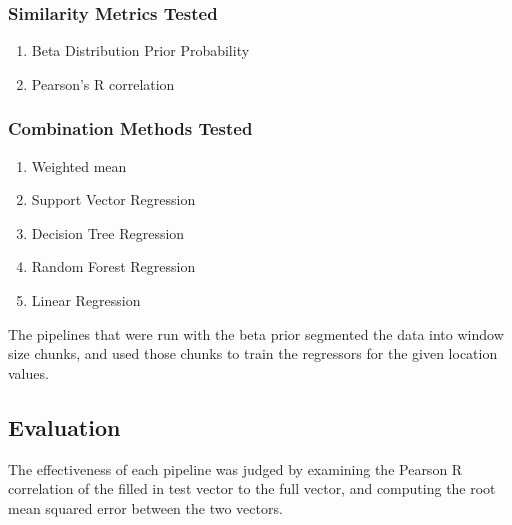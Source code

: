 \documentclass{article} %
\begin{document}
\subsubsection{Similarity Metrics Tested}
\begin{enumerate}
	\item Beta Distribution Prior Probability
	\item Pearson's R correlation
\end{enumerate}

\subsubsection{Combination Methods Tested}
\begin{enumerate}
	\item Weighted mean
	\item Support Vector Regression
	\item Decision Tree Regression
	\item Random Forest Regression
	\item Linear Regression
\end{enumerate}

The pipelines that were run with the beta prior segmented the data into window size chunks, and used those chunks to train the regressors for the given location values.

\subsection{Evaluation}
The effectiveness of each pipeline was judged by examining the Pearson R correlation of the filled in test vector to the full vector, and computing the root mean squared error between the two vectors.
\end{document}
